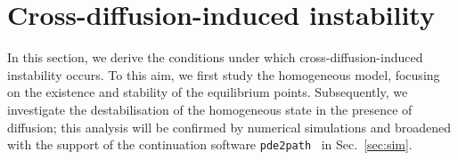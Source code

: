 \documentclass[11pt]{elsarticle}
\theoremstyle{plain}
\theoremstyle{definition}
\theoremstyle{myremark}
\begin{document}
\section{Cross-diffusion-induced instability}\label{sec:TI}

In this section, we derive the conditions under which cross-diffusion-induced instability occurs. To this aim, we first study the homogeneous model, focusing on the existence and stability of the equilibrium points. Subsequently, we investigate the destabilisation of the homogeneous state in the presence of diffusion; this analysis will be confirmed by numerical simulations and broadened with the support of the continuation software \texttt{pde2path}~\cite{Uecker_2021} in Sec.~\ref{sec:sim}.
\end{document}
